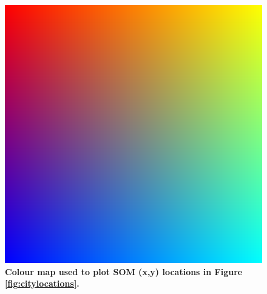 \documentclass[9pt,twocolumn,twoside,lineno]{pnas-new}
\begin{document}






\begin{figure}
\centering
\includegraphics[trim={0 0 0 0},clip,scale=0.09]{cubediagonal.png}
\caption{\bf Colour map used to plot SOM (x,y) locations in Figure \ref{fig:citylocations}. }
 \label{fig:colormap}
\end{figure} 
\end{document}
